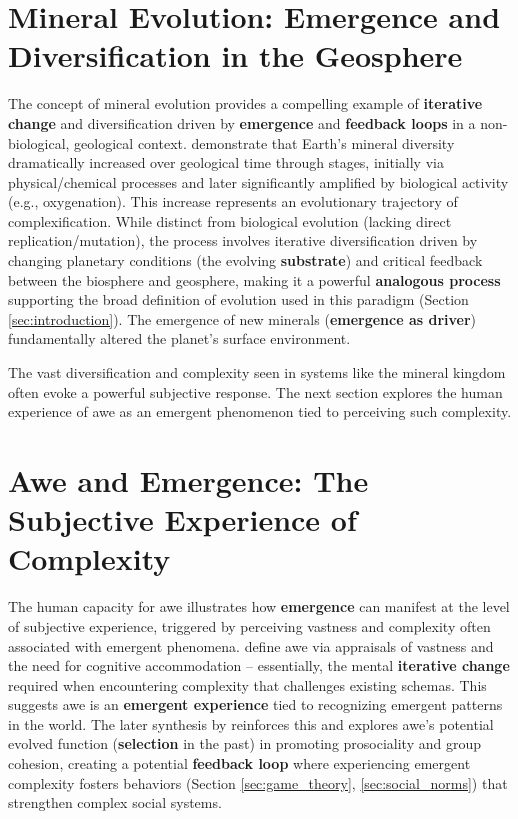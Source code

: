 \documentclass[12pt,openany]{book}
\begin{document}
\section{Mineral Evolution: Emergence and Diversification in the Geosphere} \label{sec:minerals}
The concept of mineral evolution provides a compelling example of \textbf{iterative change} and diversification driven by \textbf{emergence} and \textbf{feedback loops} in a non-biological, geological context. \citet{hazen2008mineral} demonstrate that Earth's mineral diversity dramatically increased over geological time through stages, initially via physical/chemical processes and later significantly amplified by biological activity (e.g., oxygenation). This increase represents an evolutionary trajectory of complexification. While distinct from biological evolution (lacking direct replication/mutation), the process involves iterative diversification driven by changing planetary conditions (the evolving \textbf{substrate}) and critical feedback between the biosphere and geosphere, making it a powerful \textbf{analogous process} supporting the broad definition of evolution used in this paradigm (Section \ref{sec:introduction}). The emergence of new minerals (\textbf{emergence as driver}) fundamentally altered the planet's surface environment.

The vast diversification and complexity seen in systems like the mineral kingdom often evoke a powerful subjective response. The next section explores the human experience of awe as an emergent phenomenon tied to perceiving such complexity.

\section{Awe and Emergence: The Subjective Experience of Complexity} \label{sec:awe}
The human capacity for awe illustrates how \textbf{emergence} can manifest at the level of subjective experience, triggered by perceiving vastness and complexity often associated with emergent phenomena. \citet{keltner2003approaching} define awe via appraisals of vastness and the need for cognitive accommodation – essentially, the mental \textbf{iterative change} required when encountering complexity that challenges existing schemas. This suggests awe is an \textbf{emergent experience} tied to recognizing emergent patterns in the world. The later synthesis by \citet{keltner2023science} reinforces this and explores awe's potential evolved function (\textbf{selection} in the past) in promoting prosociality and group cohesion, creating a potential \textbf{feedback loop} where experiencing emergent complexity fosters behaviors (Section \ref{sec:game_theory}, \ref{sec:social_norms}) that strengthen complex social systems.
\end{document}
